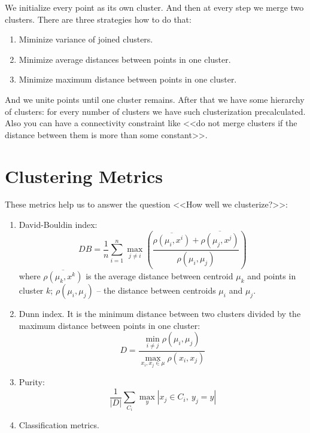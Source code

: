 We initialize every point as its own cluster. And then at every step we merge two clusters. There are three strategies how to do that:
\begin{enumerate}
	\item Miminize variance of joined clusters.
	\item Minimize average distances between points in one cluster.
	\item Minimize maximum distance between points in one cluster.
\end{enumerate}
And we unite points until one cluster remains. After that we have some hierarchy of clusters: for every number of clusters we have such clusterization precalculated.\\
Also you can have a connectivity constraint like <<do not merge clusters if the distance between them is more than some constant>>.

\section{Clustering Metrics}

These metrics help us to answer the question <<How well we clusterize?>>:
\begin{enumerate}
	\item David-Bouldin index: $$DB=\frac{1}{n}\sum\limits_{i=1}^{n}\max\limits_{j\ne i}\left(\frac{\overline{\rho(\mu_i,x^i)}+\overline{\rho(\mu_j,x^j)}}{\rho(\mu_i,\mu_j)}\right)$$ where $\overline{\rho(\mu_k,x^k)}$ is the average distance between centroid $\mu_k$ and points in cluster $k$; $\rho(\mu_i,\mu_j)$ -- the distance between centroids $\mu_i$ and $\mu_j$.
	\item Dunn index. It is the minimum distance between two clusters divided by the maximum distance between points in one cluster: $$D=\frac{\min\limits_{i\ne j}\rho(\mu_i,\mu_j)}{\max\limits_{x_i,x_j\in\mu}\rho(x_i,x_j)}$$
	\item Purity: $$\frac{1}{|D|}\sum\limits_{C_i}\max\limits_{y}|x_j\in C_i,\ y_j=y|$$
	\item Classification metrics.
\end{enumerate}
